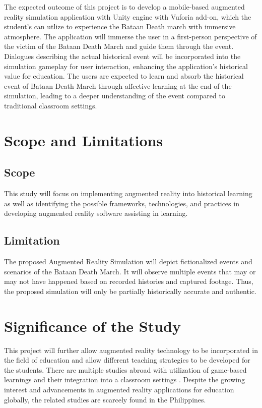 The expected outcome of this project is to develop a mobile-based augmented reality simulation application with Unity engine with Vuforia add-on, which the student's can utlize to experience the Bataan Death march with immersive atmosphere. The application will immerse the user in a first-person perspective of the victim of the Bataan Death March and guide them through the event. Dialogues describing the actual historical event will be incorporated into the simulation gameplay for user interaction, enhancing the application's historical value for education. The users are expected to learn and absorb the historical event of Bataan Death March through affective learning at the end of the simulation, leading to a deeper understanding of the event compared to traditional classroom settings.
 
\section{Scope and Limitations}
\subsection*{Scope}
This study will focus on implementing augmented reality into historical learning as well as identifying the possible frameworks, technologies, and practices in developing augmented reality software assisting in learning.
\

\subsection*{Limitation}
The proposed Augmented Reality Simulation will depict fictionalized events and scenarios of the Bataan Death March. It will observe multiple events that may or may not have happened based on recorded histories and captured footage. Thus, the proposed simulation will only be partially historically accurate and authentic.

\section{Significance of the Study}
This project will further allow augmented reality technology to be incorporated in the field of education and allow different teaching strategies to be developed for the students. There are multiple studies abroad with utilization of game-based learnings and their integration into a classroom settings \cite{watson2011}. Despite the growing interest and advancements in augmented reality applications for education globally, the related studies are scarcely found in the Philippines. 

